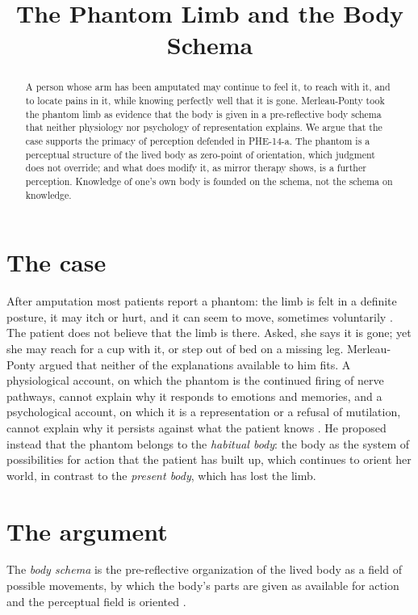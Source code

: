 \documentclass{situationist-preprint}
\title{The Phantom Limb and the Body Schema}
\begin{document}
\maketitle

\begin{abstract}
A person whose arm has been amputated may continue to feel it, to reach with it, and to locate pains in it, while knowing perfectly well that it is gone. Merleau-Ponty took the phantom limb as evidence that the body is given in a pre-reflective body schema that neither physiology nor psychology of representation explains. We argue that the case supports the primacy of perception defended in PHE-14-a. The phantom is a perceptual structure of the lived body as zero-point of orientation, which judgment does not override; and what does modify it, as mirror therapy shows, is a further perception. Knowledge of one's own body is founded on the schema, not the schema on knowledge.
\end{abstract}

\section{The case}

After amputation most patients report a phantom: the limb is felt in a definite posture, it may itch or hurt, and it can seem to move, sometimes voluntarily \citep{Ramachandran1998}. The patient does not believe that the limb is there. Asked, she says it is gone; yet she may reach for a cup with it, or step out of bed on a missing leg. Merleau-Ponty argued that neither of the explanations available to him fits. A physiological account, on which the phantom is the continued firing of nerve pathways, cannot explain why it responds to emotions and memories, and a psychological account, on which it is a representation or a refusal of mutilation, cannot explain why it persists against what the patient knows \citep[Part~I, ch.~1]{MerleauPonty1945}. He proposed instead that the phantom belongs to the \emph{habitual body}: the body as the system of possibilities for action that the patient has built up, which continues to orient her world, in contrast to the \emph{present body}, which has lost the limb.

\section{The argument}

\begin{definition}\label{d:schema}
The \emph{body schema} is the pre-reflective organization of the lived body as a field of possible movements, by which the body's parts are given as available for action and the perceptual field is oriented \citep{Gallagher2005}.
\end{definition}
\end{document}
